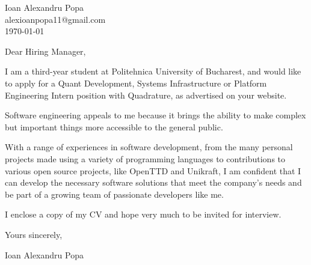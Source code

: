 \documentclass[parskip=yes]{scrartcl}
\begin{document}
\begin{flushright}
	Ioan Alexandru Popa \\ alexioanpopa11@gmail.com \\ \today
\end{flushright}

Dear Hiring Manager,

I am a third-year student at Politehnica University of Bucharest, and would like to apply for a Quant Development, Systems Infrastructure or Platform Engineering Intern position with Quadrature, as advertised on your website.

Software engineering appeals to me because it brings the ability to make complex but important things more accessible to the general public.

With a range of experiences in software development, from the many personal projects made using a variety of programming languages to contributions to various open source projects, like OpenTTD and Unikraft, I am confident that I can develop the necessary software solutions that meet the company's needs and be part of a growing team of passionate developers like me.

I enclose a copy of my CV and hope very much to be invited for interview.

Yours sincerely,

Ioan Alexandru Popa
\end{document}
